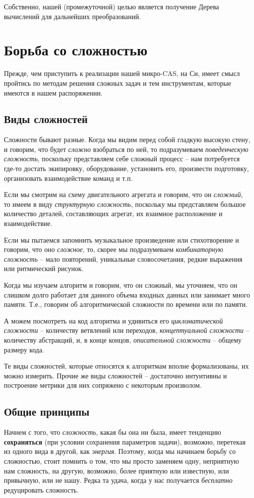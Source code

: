 \documentclass[10pt]{report}
\begin{document}
Собственно, нашей (промежуточной) целью является получение Дерева вычислений для дальнейших преобразований. 

\section{Борьба со сложностью}
Прежде, чем приступить к реализации нашей микро-CAS, на Си, имеет смысл пройтись по методам решения сложных задач
и тем инструментам, которые имеются в нашем распоряжении.

\subsection{Виды сложностей}
Сложности бывают разные. Когда мы видим перед собой гладкую высокую стену, и говорим, что будет {\em сложно} взобраться по ней, то подразумеваем {\em поведенческую сложность}, поскольку представляем себе сложный процесс --  нам потребуется где-то достать экипировку, оборудование, установить его, произвести подготовку, организовать взаимодействие команд и т.п.

Если мы смотрим на схему двигательного агрегата и говорим, что он {\em сложный}, то имеем в виду {\em структурную сложность}, поскольку мы представляем большое количество деталей, составляющих агрегат, их взаимное расположение и взаимодействие.

Если мы пытаемся запомнить музыкальное произведение или стихотворение и говорим, что оно {\em сложное}, то, скорее мы подразумеваем {\em комбинаторную сложность} -- мало повторений, уникальные словосочетания, редкие выражения или ритмический рисунок.

Когда мы  изучаем алгоритм и говорим, что он сложный, мы уточняем, что он слишком долго работает для данного объема входных данных или занимает много памяти. Т.е., говорим об алгоритмической сложности по времени или по памяти.

А можем посмотреть на код алгоритма и удивиться его {\em цикломатической сложности}\cite{cyclomatic} -- количеству ветвлений или переходов, {\em концептуальной сложности} -- количеству абстракций, и, в конце концов, {\em описательной сложности} -- общему размеру кода. 

Те виды сложностей, которые относятся к алгоритмам вполне формализованы, их  можно измерить.
Прочие же виды сложностей -- достаточно интуитивны и построение метрики для них сопряжено с некоторым произволом.

\subsection{Общие принципы}
Начнем с того, что {\em сложность}, какая бы она ни была, имеет тенденцию {\bf сохраняться} (при условии сохранения параметров задачи), возможно, перетекая из одного вида в другой, как {\em энергия}.
Поэтому, когда мы начинаем борьбу со сложностью, стоит помнить о том, что мы просто заменяем одну, неприятную нам сложность, на другую, возможно, более приятную или известную, или привычную, или не нашу.
Редка та удача, когда у нас получается {\em бесплатно} редуцировать сложность.
\end{document}
